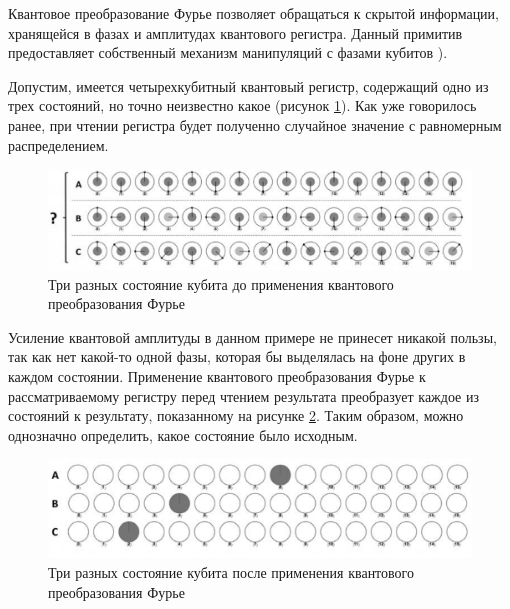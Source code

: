 Квантовое преобразование Фурье позволяет обращаться к скрытой информации, хранящейся в фазах и амплитудах квантового регистра. Данный примитив предоставляет собственный механизм манипуляций с фазами кубитов \cite{PQC-furie}).

Допустим, имеется четырехкубитный квантовый регистр, содержащий одно из трех состояний, но точно неизвестно какое (рисунок \ref{img:furie-example-01}). Как уже говорилось ранее, при чтении регистра будет полученно случайное значение с равномерным распределением. 

\begin{figure}[h]
	\begin{center}
		\includegraphics[scale=0.4]{img/furie-example.png}
	\end{center}
	\captionsetup{justification=centering}
	\caption{Три разных состояние кубита до применения квантового преобразования Фурье}
	\label{img:furie-example-01}
\end{figure}

Усиление квантовой амплитуды в данном примере не принесет никакой пользы, так как нет какой-то одной фазы, которая бы выделялась на фоне других в каждом состоянии. Применение квантового преобразования Фурье к рассматриваемому регистру перед чтением результата преобразует каждое из состояний к результату, показанному на рисунке \ref{img:furie-example-02}. Таким образом, можно однозначно определить, какое состояние было исходным.

\begin{figure}[h]
	\begin{center}
		\includegraphics[scale=0.4]{img/furie-example-02.png}
	\end{center}
	\captionsetup{justification=centering}
	\caption{Три разных состояние кубита после применения квантового преобразования Фурье}
	\label{img:furie-example-02}
\end{figure}

